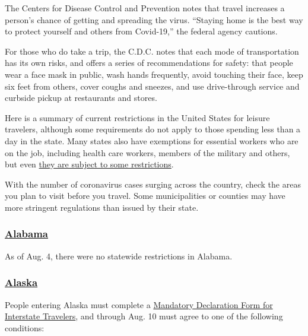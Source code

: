 The Centers for Disease Control and Prevention notes that travel
increases a person's chance of getting and spreading the virus.
``Staying home is the best way to protect yourself and others from
Covid-19,'' the federal agency cautions.

For those who do take a trip, the C.D.C. notes that each mode of
transportation has its own risks, and offers a series of recommendations
for safety: that people wear a face mask in public, wash hands
frequently, avoid touching their face, keep six feet from others, cover
coughs and sneezes, and use drive-through service and curbside pickup at
restaurants and stores.

Here is a summary of current restrictions in the United States for
leisure travelers, although some requirements do not apply to those
spending less than a day in the state. Many states also have exemptions
for essential workers who are on the job, including health care workers,
members of the military and others, but even
\href{https://www.ncsl.org/research/labor-and-employment/covid-19-essential-workers-in-the-states.aspx}{they
are subject to some restrictions}.

With the number of coronavirus cases surging across the country, check
the areas you plan to visit before you travel. Some municipalities or
counties may have more stringent regulations than issued by their state.

\hypertarget{alabama}{%
\subsubsection{\texorpdfstring{\href{https://alabama.travel/my-trip/staying-safe}{Alabama}}{Alabama}}\label{alabama}}

As of Aug. 4, there were no statewide restrictions in Alabama.

\hypertarget{alaska}{%
\subsubsection{\texorpdfstring{\href{https://covid19.alaska.gov/travelers/}{Alaska}}{Alaska}}\label{alaska}}

People entering Alaska must complete a
\href{https://covid19.alaska.gov/wp-content/uploads/2020/06/06112020-Mandate-10-Travel-declaration-form-Ver-2.0-6-10-f.pdf}{Mandatory
Declaration Form for Interstate Travelers}, and through Aug. 10 must
agree to one of the following conditions:

